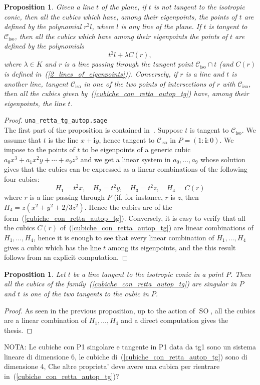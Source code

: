 \documentclass{amsart}
\theoremstyle{plain}
\newtheorem{prop}[lemma]{Proposition}
\theoremstyle{definition}
\newcommand{\iso}{\mathcal{C}_{\mathrm{iso}}}
\newcommand{\SO}{\operatorname{SO}}
\newcommand{\iii}{\textbf{i}}
\begin{document}
\begin{prop}
Given a line $t$ of the plane, if $t$ is not tangent to the isotropic
conic, then all the cubics which have, among their
eigenpoints, the points of $t$ are defined by the polynomial $r^2l$,
where $l$ is any line of the plane. If $t$ is tangent to $\iso$, then
all the cubics which have among their eigenpoints the points of $t$ are
defined by the polynomials
\begin{equation}
\label{cubiche_con_retta_autop_tg}
t^2l+\lambda C(r),
\end{equation}
where $\lambda \in K$ and $r$ is a line
passing through the tangent point $\iso\cap t$ (and $C(r)$ is defined
in~(\ref{2_lines_of_eigenpoints})). Conversely, if $r$ is a line and
$t$ is another line, tangent $\iso$ in one of the two points of intersections
of $r$ with $\iso$, then all the cubics given
by~(\ref{cubiche_con_retta_autop_tg}) have, among their eigenpoints,
the line $t$.
\end{prop}
\begin{proof}
\verb+una_retta_tg_autop.sage+\\
The first part of the proposition is contained in~.
Suppose $t$ is tangent to $\iso$. We assume that $t$ is the line
$x+\iii y$, hence tangent to $\iso$ in $P = (1: \iii: 0)$.
We impose to the points
of $t$ to be eigenpoints of a generic cubic $a_0x^3+a_1x^2y+\cdots+a_9z^3$
and we get a linear system in $a_0, \dots, a_9$ whose solution gives that
the cubics can be expressed as a linear combinations of the following
four cubics:
%
\[
H_1 = t^2x, \quad H_2 = t^2y, \quad H_3 = t^2z, \quad H_4 = C(r)
\]
%
where $r$ is a line passing through $P$ (if, for instance, $r$
is $z$, then $H_4 = z(x^2 + y^2 + 2/3z^2)$. Hence the cubics are of the
form~(\ref{cubiche_con_retta_autop_tg}). Conversely, it is easy to verify
that all the cubics $C(r)$ of~(\ref{cubiche_con_retta_autop_tg}) are
linear combinations of $H_1, \dots, H_4$, hence it is enough
to see that every linear combination of $H_1, \dots, H_4$ gives a
cubic which has the line $t$ among its eigenpoints, and the this result
follows from an explicit computation.
\end{proof}

\begin{prop}
Let $t$ be a line tangent to the isotropic conic in a point $P$. Then all the
cubics of the family~(\ref{cubiche_con_retta_autop_tg}) are singular in
$P$ and $t$ is one of the two tangents to the cubic in $P$.
\end{prop}
\begin{proof}
As seen in the previous proposition, up to the action of $\SO$, all the
cubics are a linear combination of $H_1, \dots, H_4$ and a direct
computation gives the thesis.
\end{proof}
NOTA: Le cubiche con P1 singolare e tangente in P1 data da tg1 sono
un sistema lineare di dimensione 6, le cubiche
di~(\ref{cubiche_con_retta_autop_tg}) sono di dimensione
4, Che altre proprieta' deve avere una cubica per rientrare
in~(\ref{cubiche_con_retta_autop_tg})?
\end{document}
